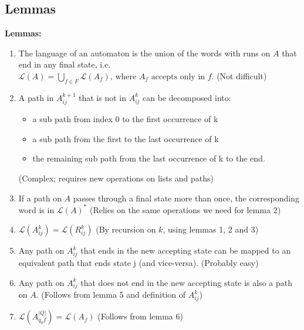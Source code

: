 \documentclass{beamer}
\begin{document}
\subsection*{Lemmas}
\begin{frame}
    \textbf{Lemmas:}


    \begin{enumerate}
        \item The language of an automaton is the union of the words with runs on $A$ that end in any final state, i.e. 
            $\mathcal{L}(A) = \bigcup_{f \in F} \mathcal{L}(A_f) \mbox {, where $A_f$ accepts only in $f$}.$ (Not difficult)
        \item
            A path in $A^{k+1}_{i j}$ that is not in $A^{k}_{i j}$ can be decomposed into:\\
            \begin{itemize}
                \item a sub path from index 0 to the first occurrence of k
                \item a sub path from the first to the last occurrence of k
                \item the remaining sub path from the last occurrence of k to the end.
            \end{itemize}
            (Complex; requires new operations on lists and paths)
    \end{enumerate}

\end{frame}

\begin{frame}

    \begin{enumerate}

            \setcounter{enumi}{2}
        \item If a path on $A$ passes through a final state more than once, the corresponding word is in $\mathcal{L}(A)^*$ (Relies on the same operations we need for lemma 2)
        \item 
            $\mathcal{L}(A^k_{i j}) = \mathcal{L}(R^k_{i j})$ (By recursion on $k$, using lemmas 1, 2 and 3)
    \end{enumerate}
\end{frame}

\begin{frame}
    \begin{enumerate}
            \setcounter{enumi}{4}
        \item Any path on $A^k_{i j}$ that ends in the new accepting state can be mapped to an equivalent path that ends state j (and vice-versa). (Probably easy)
        \item Any path on $A^k_{i j}$ that does not end in the new accepting state is also a path on $A$. (Follows from lemma 5 and definition of $A^k_{i j}$)
        \item $\mathcal{L}(A^{|Q|}_{q_0 f}) = \mathcal{L}(A_f)$ (Follows from lemma 6)
    \end{enumerate}

\end{frame}
\end{document}
